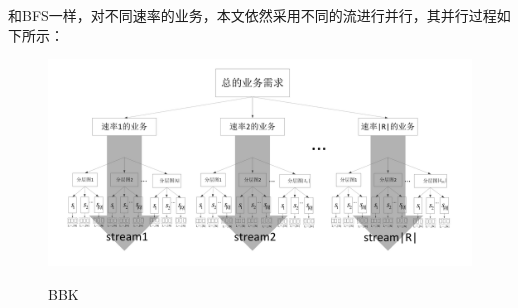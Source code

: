 和BFS一样，对不同速率的业务，本文依然采用不同的流进行并行，其并行过程如下所示：
\begin{figure}
\setlength{\belowcaptionskip}{-0.5cm}
\begin{center}
{\includegraphics[width=1 \textwidth]{figures/BBK.pdf}}
\end{center}
\caption{{\footnotesize{BBK}}}
\label{prof}
\end{figure}
